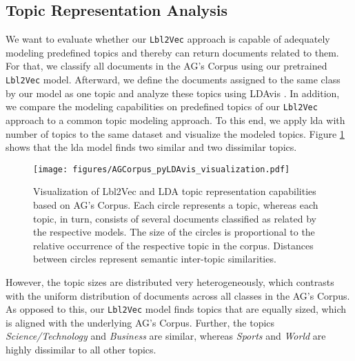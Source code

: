 \documentclass[a4paper,twoside]{article}
\begin{document}
\subsection{Topic Representation Analysis}
We want to evaluate whether our \texttt{Lbl2Vec} approach is capable of adequately modeling predefined topics and thereby can return documents related to them. For that, we classify all documents in the AG's Corpus using our pretrained \texttt{Lbl2Vec} model. Afterward, we define the documents assigned to the same class by our model as one topic and analyze these topics using LDAvis \citep{sievert-shirley-2014-ldavis}. In addition, we compare the modeling capabilities on predefined topics of our \texttt{Lbl2Vec} approach to a common topic modeling approach. To this end, we apply \ac{lda} \citep{lda} with  number of topics to the same dataset and visualize the modeled topics. Figure \ref{fig:pyLDAvis_visualization} shows that the \ac{lda} model finds two similar and two dissimilar topics.
\begin{figure}[ht]
    \centering
    \texttt{[image: figures/AGCorpus\_pyLDAvis\_visualization.pdf]}
    \caption{Visualization of Lbl2Vec and LDA topic representation capabilities based on AG's Corpus. Each circle represents a topic, whereas each topic, in turn, consists of several documents classified as related by the respective models. The size of the circles is proportional to the relative occurrence of the respective topic in the corpus. Distances between circles represent semantic inter-topic similarities.}
    \label{fig:pyLDAvis_visualization}
\end{figure}
However, the topic sizes are distributed very heterogeneously, which contrasts with the uniform distribution of documents across all classes in the AG's Corpus. As opposed to this, our \texttt{Lbl2Vec} model finds topics that are equally sized, which is aligned with the underlying AG's Corpus. Further, the topics \textit{Science/Technology} and \textit{Business} are similar, whereas \textit{Sports} and \textit{World} are highly dissimilar to all other topics.
\end{document}
